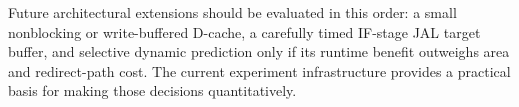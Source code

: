 \documentclass[11pt,a4paper]{article}
\begin{document}
Future architectural extensions should be evaluated in this order: a small
nonblocking or write-buffered D-cache, a
carefully timed IF-stage JAL target buffer, and selective dynamic prediction
only if its runtime benefit outweighs area and redirect-path cost.  The current
experiment infrastructure provides a practical basis for making those
decisions quantitatively.
\end{document}
